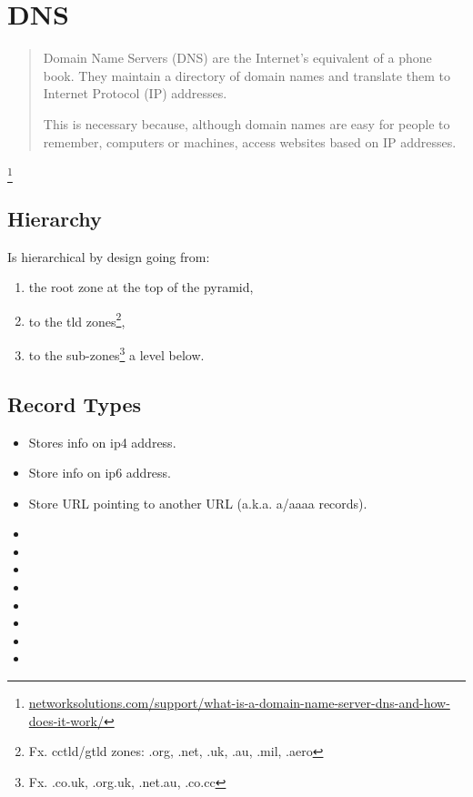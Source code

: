 \chapter{DNS}

\begin{quote}
    Domain Name Servers (DNS) are the Internet's equivalent of a phone book. They maintain a directory of domain names and translate them to Internet Protocol (IP) addresses.
    
    This is necessary because, although domain names are easy for people to remember, computers or machines, access websites based on IP addresses. 
\end{quote}\footnote{\href{http://www.networksolutions.com/support/what-is-a-domain-name-server-dns-and-how-does-it-work/}{networksolutions.com/support/what-is-a-domain-name-server-dns-and-how-does-it-work/}}

\pagebreak

\section{Hierarchy}


\pagebreak

Is hierarchical by design going from:

\begin{enumerate}
    \item the root zone at the top of the pyramid,
    \item to the \gls{tld} zones\footnote{Fx. \gls{cctld}/\gls{gtld} zones: .org, .net, .uk, .au, .mil, .aero},
    \item to the sub-zones\footnote{Fx. .co.uk, .org.uk, .net.au, .co.cc} a level below.
\end{enumerate}


\pagebreak

\section{Record Types}

\begin{itemize}
    \item {} Stores info on \gls{ip4} address.
    \item {} Store info on \gls{ip6} address.
    \item {} Store URL pointing to another URL (a.k.a. \gls{a}/\gls{aaaa} records).
    \item {}
    \item {}
    \item {}
    \item {}
    \item {}
    \item {}
    \item {}
    \item {}   
\end{itemize}

